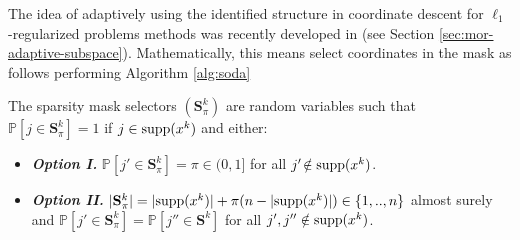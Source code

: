The idea of adaptively using the identified structure in coordinate descent for $\ell_1$-regularized problems methods was recently developed in \cite{grishchenko2020proximal} (see Section \ref{sec:mor-adaptive-subspace}). Mathematically, this means select coordinates in the mask as follows performing Algorithm \ref{alg:soda}
\begin{assumption}
\label{hyp:algoident}
The sparsity mask selectors $(\mathbf{S}_{\pi}^k)$ are random variables such that   $\mathbb{P}[j\in\mathbf{S}_{\pi}^k]=1$ if $j \in \mathrm{supp}({x^k})$ and either:
\begin{itemize}
    \item[] \textbf{\emph{Option I.}}
    $\mathbb{P}[j'\in\mathbf{S}_{\pi}^k] = \pi \in(0,1] $ for all $j'\!\notin \mathrm{supp}({x^k})$.
    \item[] \textbf{\emph{Option II.}}  $|\mathbf{S}_{\pi}^k| = |\mathrm{supp}({x^k})| + \pi(n - |\mathrm{supp}({x^k})|) \in \{ 1,..,n \} $ almost surely and  $\mathbb{P}[j'\in\mathbf{S}_{\pi}^k]=\mathbb{P}[j''\in\mathbf{S}^k]$ for all $j',j''\notin \mathrm{supp}({x^k})$.
\end{itemize}
\end{assumption}

